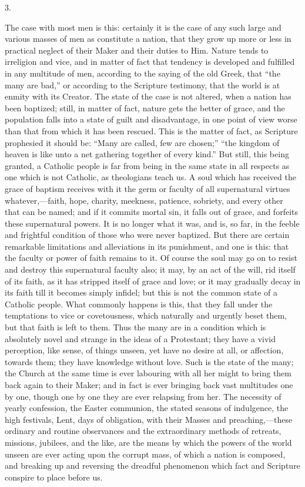3.

The case with most men is this: certainly it is the case of any
such large and various masses of men as constitute a nation, that they
grow up more or less in practical neglect of their Maker and their
duties to Him. Nature tends to irreligion and vice, and in matter of
fact that tendency is developed and fulfilled in any multitude of men,
according to the saying of the old Greek, that ``the many are
bad,'' or according to the Scripture testimony, that the world is
at enmity with its Creator. The state of the case is not altered, when
a nation has been baptized; still, in matter of fact, nature gets the
better of grace, and the population falls into a state of guilt and
disadvantage, in one point of view worse than that from which it has
been rescued. This is the matter of fact, as Scripture prophesied it
should be: ``Many are called, few are chosen;'' ``the
kingdom of heaven is like unto a net gathering together of every
kind.'' But still, this being granted, a Catholic people is far
from being in the same state in all respects as one which is not
Catholic, as theologians teach us. A soul which has received the grace
of baptism receives with it the germ or faculty of all supernatural
virtues whatever,—faith, hope, charity, meekness, patience, sobriety,
and every other that can be named; and if it commits mortal sin, it
falls out of grace, and forfeits these supernatural powers. It is no
longer what it was, and is, so far, in the feeble and frightful
condition of those who were never baptized. But there are certain
remarkable limitations and alleviations in its punishment, and one is
this: that the faculty or power of faith remains to it. Of course the
soul may go on to resist and destroy this supernatural faculty also;
it may, by an act of the will, rid itself of its faith, as it has
stripped itself of grace and love; or it may gradually decay in its
faith till it becomes simply infidel; but this is not the common state
of a Catholic people. What commonly happens is this, that they fall
under the temptations to vice or covetousness, which naturally and
urgently beset them, but that faith is left to them. Thus the many are
in a condition which is absolutely novel and strange in the ideas of a
Protestant; they have a vivid perception, like sense, of things
unseen, yet have no desire at all, or affection, towards them; they
have knowledge without love. Such is the state of the many; the Church
at the same time is ever labouring with all her might to bring them
back again to their Maker; and in fact is ever bringing back vast
multitudes one by one, though one by one they are ever relapsing from
her. The necessity of yearly confession, the Easter communion, the
stated seasons of indulgence, the high festivals, Lent, days of
obligation, with their Masses and preaching,—these ordinary and
routine observances and the extraordinary methods of retreats,
missions, jubilees, and the like, are the means by which the powers of
the world unseen are ever acting upon the corrupt mass, of which a
nation is composed, and breaking up and reversing the dreadful
phenomenon which fact and Scripture conspire to place before us.

